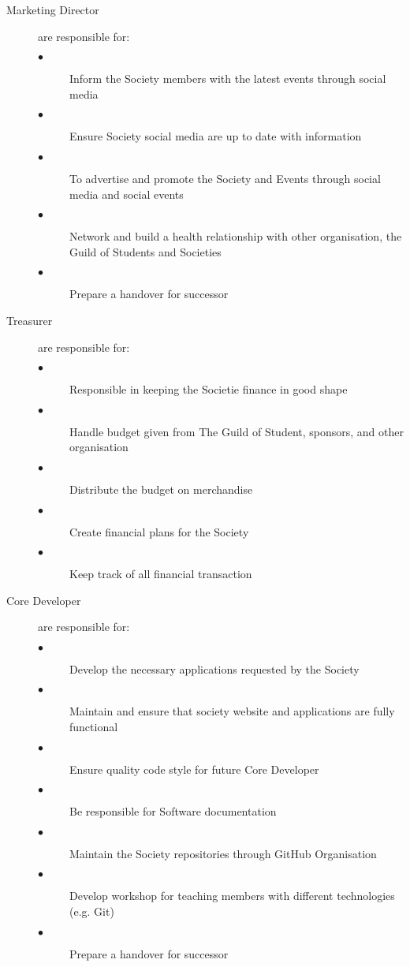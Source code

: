 \documentclass{report}
\begin{document}
\begin{description}
    \item[Marketing Director] are responsible for:
      \begin{description}
        \item[$\bullet$] Inform the Society members with the latest events through social media
        \item[$\bullet$] Ensure Society social media are up to date with information
        \item[$\bullet$] To advertise and promote the Society and Events through social media 
        and social events
        \item[$\bullet$] Network and build a health relationship with other organisation,
        the Guild of Students and Societies
        \item[$\bullet$] Prepare a handover for successor
      \end{description}

    \item[Treasurer] are responsible for: 
      \begin{description}
        \item[$\bullet$] Responsible in keeping the Societie finance in good shape
        \item[$\bullet$] Handle budget given from The Guild of Student, 
        sponsors, and other organisation
        \item[$\bullet$] Distribute the budget on merchandise
        \item[$\bullet$] Create financial plans for the Society
        \item[$\bullet$] Keep track of all financial transaction
      \end{description}

    \item[Core Developer] are responsible for: 
      \begin{description}
        \item[$\bullet$] Develop the necessary applications requested by the Society
        \item[$\bullet$] Maintain and ensure that society website and applications
        are fully functional
        \item[$\bullet$] Ensure quality code style for future Core Developer
        \item[$\bullet$] Be responsible for Software documentation 
        \item[$\bullet$] Maintain the Society repositories through GitHub Organisation
        \item[$\bullet$] Develop workshop for teaching members with different
        technologies (e.g. Git)
        \item[$\bullet$] Prepare a handover for successor
      \end{description}


\end{description}
\end{document}
